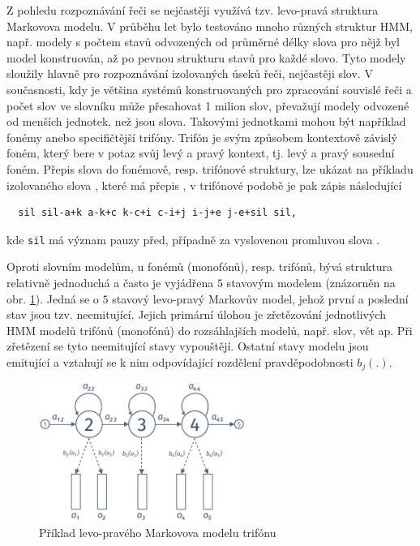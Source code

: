 Z pohledu rozpoznávání řeči se nejčastěji využívá tzv. levo-pravá struktura Markovova modelu. V průběhu let bylo testováno mnoho různých struktur HMM, např. modely s počtem stavů odvozených od průměrné délky slova pro nějž byl model konstruován, až po pevnou strukturu stavů pro každé slovo. Tyto modely sloužily hlavně pro rozpoznávání izolovaných úseků řeči, nejčastěji slov. V současnosti, kdy je většina systémů konstruovaných pro zpracování souvislé řeči a počet slov ve slovníku může přesahovat 1 milion slov, převažují modely odvozené od menších jednotek, než jsou slova. Takovými jednotkami mohou být například fonémy anebo specifičtější trifóny. Trifón je svým způsobem kontextově závislý foném, který bere v potaz svůj levý a pravý kontext, tj. levý a pravý sousední foném. Přepis slova do fonémově, resp. trifónové struktury, lze ukázat na příkladu izolovaného slova , které má přepis , v trifónové podobě je pak zápis následující

\begin{verbatim}
  sil sil-a+k a-k+c k-c+i c-i+j i-j+e j-e+sil sil,
\end{verbatim}

\noindent kde \texttt{sil} má význam pauzy před, případně za vyslovenou promluvou slova .

Oproti slovním modelům, u fonémů (monofónů), resp. trifónů, bývá struktura relativně jednoduchá a často je vyjádřena $5$ stavovým modelem (znázorněn na obr. \ref{fig:asr:acoustic:hmm}). Jedná se o $5$ stavový levo-pravý Markovův model, jehož první a poslední stav jsou tzv. neemitující. Jejich primární úlohou je zřetězování jednotlivých HMM modelů trifónů (monofónů) do rozsáhlajších modelů, např. slov, vět ap. Při zřetězení se tyto neemitující stavy vypouštějí. Ostatní stavy modelu jsou emitující a vztahují se k nim odpovídající rozdělení pravděpodobnosti $b_j(.)$.

\begin{figure}[hbpt]
  \centering
  \includegraphics[width=0.6\textwidth]{./ch4-asr/img/hmm_structure.pdf}
  \caption{Příklad levo-pravého Markovova modelu trifónu}
  \label{fig:asr:acoustic:hmm}
\end{figure}

